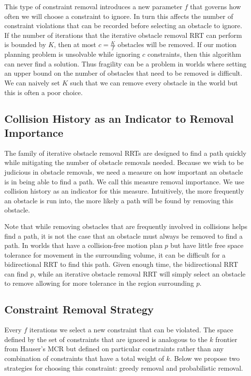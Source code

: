 This type of constraint removal introduces a new parameter $f$ that governs how often we will choose a constraint to ignore. In turn this affects the number of constraint violations that can be recorded before selecting an obstacle to ignore. If the number of iterations that the iterative obstacle removal RRT can perform is bounded by $K$, then at most $c=\frac{K}{f}$ obstacles will be removed. If our motion planning problem is unsolvable while ignoring $c$ constraints, then this algorithm can never find a solution. Thus fragility can be a problem in worlds where setting an upper bound on the number of obstacles that need to be removed is difficult. We can naively set $K$ such that we can remove every obstacle in the world but this is often a poor choice.

\subsection{Collision History as an Indicator to Removal Importance}
The family of iterative obstacle removal RRTs are designed to find a path quickly while mitigating the number of obstacle removals needed. Because we wish to be judicious in obstacle removals, we need a measure on how important an obstacle is in being able to find a path. We call this measure removal importance. We use collision history as an indicator for this measure. Intuitively, the more frequently an obstacle is run into, the more likely a path will be found by removing this obstacle.

Note that while removing obstacles that are frequently involved in collisions helps find a path, it is not the case that an obstacle must always be removed to find a path. In worlds that have a collision-free motion plan $p$ but have little free space tolerance for movement in the surrounding volume, it can be difficult for a bidirectional RRT to find this path. Given enough time, the bidirectional RRT can find $p$, while an iterative obstacle removal RRT will simply select an obstacle to remove allowing for more tolerance in the region surrounding $p$.

\subsection{Constraint Removal Strategy}
Every $f$ iterations we select a new constraint that can be violated. The space defined by the set of constraints that are ignored is analogous to the $k$ frontier from Hauser's MCR but defined on particular constraints rather than any combination of constraints that have a total weight of $k$. Below we propose two strategies for choosing this constraint: greedy removal and probabilistic removal.

